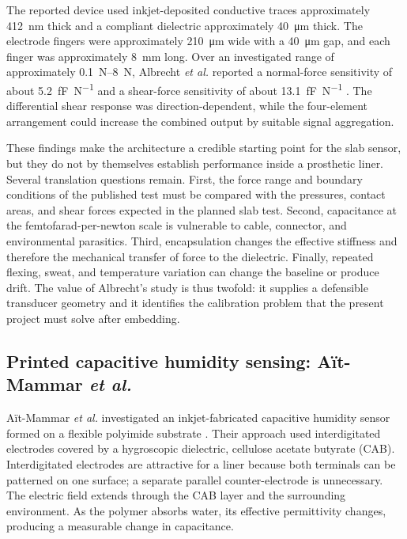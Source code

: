 \documentclass[12pt,a4paper]{article}
\begin{document}
The reported device used inkjet-deposited conductive traces approximately
\SI{412}{\nano\metre} thick and a compliant dielectric approximately
\SI{40}{\micro\metre} thick. The electrode fingers were approximately
\SI{210}{\micro\metre} wide with a \SI{40}{\micro\metre} gap, and each
finger was approximately \SI{8}{\milli\metre} long. Over an investigated range
of approximately \SIrange{0.1}{8}{\newton}, Albrecht \textit{et al.} reported a
normal-force sensitivity of about \SI{5.2}{\femto\farad\per\newton} and a
shear-force sensitivity of about
\SI{13.1}{\femto\farad\per\newton} \cite{albrecht2019}. The differential shear
response was direction-dependent, while the four-element arrangement could
increase the combined output by suitable signal aggregation.

These findings make the architecture a credible starting point for the slab
sensor, but they do not by themselves establish performance inside a prosthetic
liner. Several translation questions remain. First, the force range and
boundary conditions of the published test must be compared with the pressures,
contact areas, and shear forces expected in the planned slab test. Second,
capacitance at the femtofarad-per-newton scale is vulnerable to cable,
connector, and environmental parasitics. Third, encapsulation changes the
effective stiffness and therefore the mechanical transfer of force to the
dielectric. Finally, repeated flexing, sweat, and temperature variation can
change the baseline or produce drift. The value of Albrecht's study is thus
twofold: it supplies a defensible transducer geometry and it identifies the
calibration problem that the present project must solve after embedding.

\subsection{Printed capacitive humidity sensing: Aït-Mammar \textit{et al.}}

Aït-Mammar \textit{et al.} investigated an inkjet-fabricated capacitive humidity
sensor formed on a flexible polyimide substrate
\cite{aitmammar2020}. Their approach used interdigitated electrodes covered by
a hygroscopic dielectric, cellulose acetate butyrate (CAB). Interdigitated
electrodes are attractive for a liner because both terminals can be patterned
on one surface; a separate parallel counter-electrode is unnecessary. The
electric field extends through the CAB layer and the surrounding environment.
As the polymer absorbs water, its effective permittivity changes, producing a
measurable change in capacitance.
\end{document}
